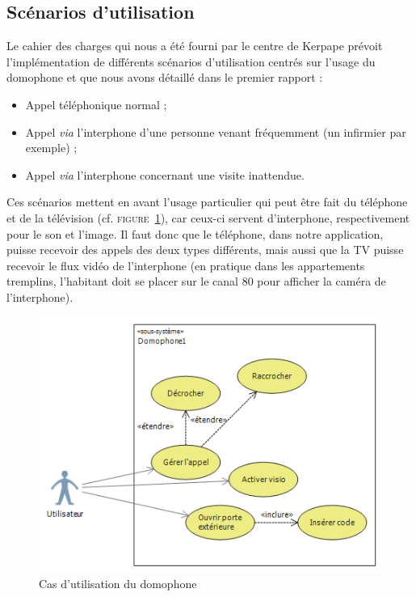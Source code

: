 \subsection{Scénarios d'utilisation}
Le cahier des charges qui nous a été fourni par le centre de Kerpape prévoit l'implémentation de différents scénarios d'utilisation centrés sur l'usage du domophone et que nous avons détaillé dans le premier rapport :
\begin{itemize}
\item Appel téléphonique normal ;
\item Appel \textit{via} l'interphone d'une personne venant fréquemment (un infirmier par exemple) ;
\item Appel \textit{via} l'interphone concernant une visite inattendue.
\end{itemize}
Ces scénarios mettent en avant l'usage particulier qui peut être fait du téléphone et de la télévision (cf. \textsc{figure~\ref{domophone}}), car ceux-ci servent d'interphone, respectivement pour le son et l'image. Il faut donc que le téléphone, dans notre application, puisse recevoir des appels des deux types différents, mais aussi que la TV puisse recevoir le flux vidéo de l'interphone (en pratique dans les appartements tremplins, l'habitant doit se placer sur le canal 80 pour afficher la caméra de l'interphone).
\begin{figure}[h!]
	\begin{center}
  		\caption{Cas d'utilisation du domophone}
  		\label{domophone}
  		\includegraphics[width=\textwidth]{2-Specifications/img-utilisateur/use_case_diag.PNG}
  	\end{center}
\end{figure}

